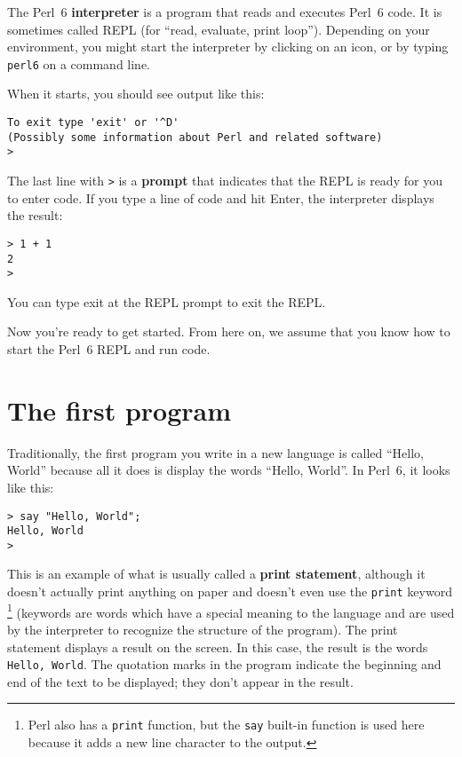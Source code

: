 The Perl~6 {\bf interpreter} is a program that reads and 
executes Perl~6 code. It is sometimes called REPL (for ``read, 
evaluate, print loop''). Depending on your environment, you 
might start the interpreter by clicking on an icon, or by 
typing {\tt perl6} on a command line.

When it starts, you should see output like this:

\begin{verbatim}
To exit type 'exit' or '^D'
(Possibly some information about Perl and related software)
> 
\end{verbatim}
%

The last line with {\tt >} is a {\bf prompt} that indicates 
that the REPL is ready for you to enter code. If you type a 
line of code and hit Enter, the interpreter displays the
result: 

\begin{verbatim}
> 1 + 1
2
>
\end{verbatim}
%
You can type exit at the REPL prompt to exit the REPL.

Now you're ready to get started.
From here on, we assume that you know how to start the Perl~6
REPL and run code.


\section{The first program}
\label{hello}

Traditionally, the first program you write in a new language
is called ``Hello, World'' because all it does is display the
words ``Hello, World''.  In Perl~6, it looks like this:

\begin{verbatim}
> say "Hello, World";
Hello, World
>
\end{verbatim}
%
This is an example of what is usually called a {\bf print statement}, although it
doesn't actually print anything on paper and doesn't even 
use the {\tt print} keyword \footnote{Perl also has a {\tt print} 
function, but the {\tt say} built-in function is used here 
because it adds a new line character to the output.} (keywords are 
words which have a special meaning to the language and are 
used by the interpreter to recognize the structure of the program).  
The print statement displays a result on the screen.  In this case, 
the result is the words {\tt Hello, World}.
%
The quotation marks in the program indicate the beginning and end
of the text to be displayed; they don't appear in the result.

